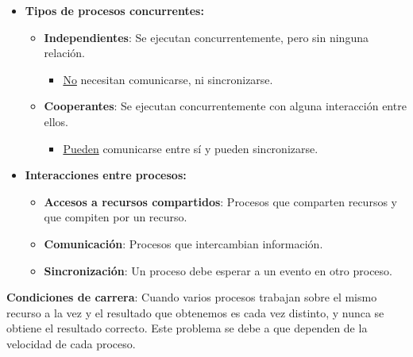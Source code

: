 \documentclass[12pt, twoside, openright]{report} %
\begin{document}
\begin{itemize}
\begin{itemize}
    \end{itemize}
  \item \textbf{Tipos de procesos concurrentes:}
    

    \begin{itemize}
    \item \textbf{Independientes}: Se ejecutan concurrentemente, pero sin
      ninguna relación.
      

      \begin{itemize}
      \item \underline{No} necesitan comunicarse, ni sincronizarse.
        
      \end{itemize}
    \item \textbf{Cooperantes}: Se ejecutan concurrentemente con alguna
      interacción entre ellos.
      

      \begin{itemize}
      \item \underline{Pueden} comunicarse entre sí y pueden sincronizarse.
        
      \end{itemize}
    \end{itemize}
	\pagebreak
  \item \textbf{Interacciones entre procesos:}
    

    \begin{itemize}
    \item \textbf{Accesos a recursos compartidos}: Procesos que comparten
      recursos y que compiten por un recurso.
      
    \item \textbf{Comunicación}: Procesos que intercambian información.
      
    \item \textbf{Sincronización}: Un proceso debe esperar a un evento en
      otro proceso.
      
    \end{itemize}
  \end{itemize}
\textbf{Condiciones de carrera}: Cuando varios procesos trabajan sobre
  el mismo recurso a la vez y el resultado que obtenemos es cada vez
  distinto, y nunca se obtiene el resultado correcto. Este problema se
  debe a que dependen de la velocidad de cada proceso.
  
\end{document}
